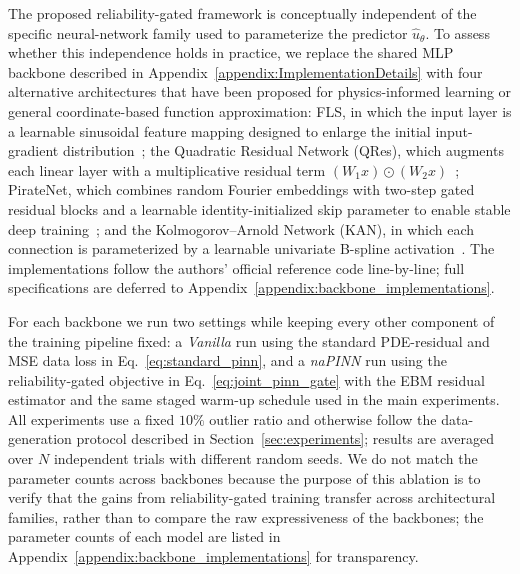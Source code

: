 \documentclass{article}
\theoremstyle{plain}
\theoremstyle{definition}
\theoremstyle{remark}
\begin{document}
The proposed reliability-gated framework is conceptually independent of the
specific neural-network family used to parameterize the predictor
$\hat{u}_\theta$. To assess whether this independence holds in practice, we
replace the shared MLP backbone described in
Appendix~\ref{appendix:ImplementationDetails} with four alternative
architectures that have been proposed for physics-informed learning or
general coordinate-based function approximation: FLS, in which the input layer is a learnable sinusoidal feature
mapping designed to enlarge the initial input-gradient
distribution~\cite{Wong2022FLS}; the Quadratic Residual Network (QRes),
which augments each linear layer with a multiplicative residual term
$(W_1 x)\odot(W_2 x)$~\cite{Bu2021QRes}; PirateNet, which combines random
Fourier embeddings with two-step gated residual blocks and a learnable
identity-initialized skip parameter to enable stable deep
training~\cite{Wang2024PirateNet}; and the Kolmogorov--Arnold Network (KAN),
in which each connection is parameterized by a learnable univariate
B-spline activation~\cite{Liu2024KAN}. The implementations follow the
authors' official reference code line-by-line; full specifications are
deferred to Appendix~\ref{appendix:backbone_implementations}.

For each backbone we run two settings while keeping every other component
of the training pipeline fixed: a \emph{Vanilla} run using the standard
PDE-residual and MSE data loss in Eq.~\eqref{eq:standard_pinn}, and a
\emph{naPINN} run using the reliability-gated objective in
Eq.~\eqref{eq:joint_pinn_gate} with the EBM residual estimator and the same
staged warm-up schedule used in the main experiments. All experiments use a
fixed $10\%$ outlier ratio and otherwise follow the data-generation protocol
described in Section~\ref{sec:experiments}; results are averaged over $N$
independent trials with different random seeds. We do not match the parameter
counts across backbones because the purpose of this ablation is to verify
that the gains from reliability-gated training transfer across architectural
families, rather than to compare the raw expressiveness of the backbones; the
parameter counts of each model are listed in
Appendix~\ref{appendix:backbone_implementations} for transparency.
\end{document}
